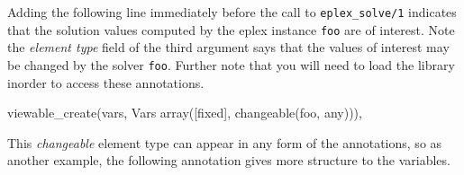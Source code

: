 
Adding the following line immediately before the call to
\texttt{eplex_solve/1} indicates that the solution values computed by
the eplex instance \texttt{foo} are of interest.  Note the
\emph{element type} field of the third argument says that the values
of interest may be changed by the solver \texttt{foo}.  Further note
that you will need to load the \viewable library inorder to access
these annotations.

\begin{code}
viewable_create(vars, Vars
                array([fixed], changeable(foo, any))),
\end{code}        

This \emph{changeable} element type can appear in any form of the
annotations, so as another example, the following annotation gives
more structure to the variables.

